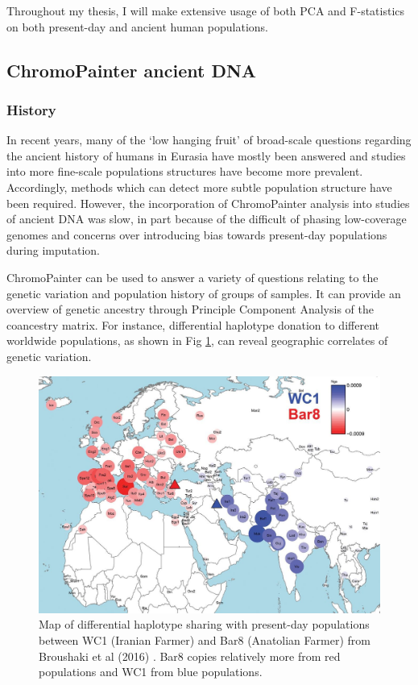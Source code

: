Throughout my thesis, I will make extensive usage of both PCA and F-statistics on both present-day and ancient human populations.


\subsection{ChromoPainter ancient DNA}

\subsubsection{History}

In recent years, many of the `low hanging fruit' of broad-scale questions regarding the ancient history of humans in Eurasia have mostly been answered and studies into more fine-scale populations structures have become more prevalent. Accordingly, methods which can detect more subtle population structure have been required. However, the incorporation of ChromoPainter analysis into studies of ancient DNA was slow, in part because of the difficult of phasing low-coverage genomes and concerns over introducing bias towards present-day populations during imputation. 

ChromoPainter can be used to answer a variety of questions relating to the genetic variation and population history of groups of samples. It can provide an overview of genetic ancestry through Principle Component Analysis of the coancestry matrix. For instance, differential haplotype donation to different worldwide populations, as shown in Fig \ref{fig:broushaki_haplotype_sharing}, can reveal geographic correlates of genetic variation. 

\begin{figure}[htp]
    \centering
    \includegraphics[width=1.0\textwidth]{../images/introduction/broushaki_haplotype_sharing.jpg}
    \caption{Map of differential haplotype sharing with present-day populations between WC1 (Iranian Farmer) and Bar8 (Anatolian Farmer) from Broushaki et al (2016) \cite{Broushaki2016a}. Bar8 copies relatively more from red populations and WC1 from blue populations.}
    \label{fig:broushaki_haplotype_sharing}
\end{figure}


